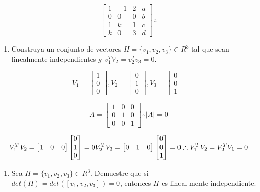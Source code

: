 \documentclass[
  11,
]{article}
\providecommand{\tightlist}{%
  \setlength{\itemsep}{0pt}\setlength{\parskip}{0pt}}
\begin{document}
\[
  \begin{bmatrix}1&-1&2&a\\0&0&0&b\\1&k&1&c\\k&0&3&d\end{bmatrix} \therefore \text{}
  \]

\begin{enumerate}
\def\labelenumi{\arabic{enumi}.}
\setcounter{enumi}{3}
\tightlist
\item
  Construya un conjunto de vectores \(H = \{v_1, v_2, v_3\} \in R^3\)
  tal que sean linealmente independientes y \(v_1^TV_2 = v_2^Tv_3 = 0\).
\end{enumerate}

\[
  V_1 = \begin{bmatrix}1\\0\\0\end{bmatrix} , V_2 = \begin{bmatrix}0\\1\\0\end{bmatrix}, V_3 = \begin{bmatrix}0\\0\\1\end{bmatrix}
  \]

\[
  A = \begin{bmatrix}1&0&0\\0&1&0\\0&0&1\end{bmatrix} \therefore |A| = 0
  \]

\[
  V_1^T V_2 = \begin{bmatrix}1&0&0\end{bmatrix} \begin{bmatrix}0\\1\\0\end{bmatrix} = 0 \\ V_2^TV_3 = \begin{bmatrix}0&1&0\end{bmatrix} \begin{bmatrix}0\\0\\1\end{bmatrix} = 0 \\ \therefore \\ V_1^TV_2 = V_2^TV_1 = 0
  \]

\begin{enumerate}
\def\labelenumi{\arabic{enumi}.}
\setcounter{enumi}{4}
\tightlist
\item
  Sea \(H = \{v_1, v_2, v_3\} \in R^3\). Demuestre que si
  \(det(H) = det( [v_1, v_2, v_3] ) = 0\), entonces \(H\) es
  lineal-mente independiente.
\end{enumerate}
\end{document}
